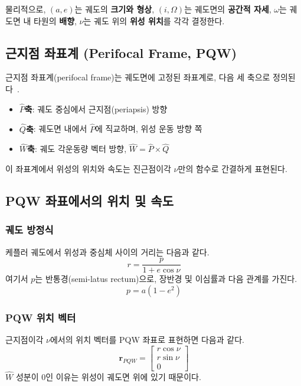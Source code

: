 \documentclass[11pt]{article}
\begin{document}
물리적으로, $(a, e)$는 궤도의 \textbf{크기와 형상}, $(i, \Omega)$는 궤도면의 \textbf{공간적 자세}, $\omega$는 궤도면 내 타원의 \textbf{배향}, $\nu$는 궤도 위의 \textbf{위성 위치}를 각각 결정한다.

\subsection{근지점 좌표계 (Perifocal Frame, PQW)}

근지점 좌표계(perifocal frame)는 궤도면에 고정된 좌표계로, 다음 세 축으로 정의된다~\cite{Curtis2020}.

\begin{itemize}
  \item \textbf{$\hat{P}$축}: 궤도 중심에서 근지점(periapsis) 방향
  \item \textbf{$\hat{Q}$축}: 궤도면 내에서 $\hat{P}$에 직교하며, 위성 운동 방향 쪽
  \item \textbf{$\hat{W}$축}: 궤도 각운동량 벡터 방향, $\hat{W} = \hat{P} \times \hat{Q}$
\end{itemize}

이 좌표계에서 위성의 위치와 속도는 진근점이각 $\nu$만의 함수로 간결하게 표현된다.

\subsection{PQW 좌표에서의 위치 및 속도}

\subsubsection{궤도 방정식}

케플러 궤도에서 위성과 중심체 사이의 거리는 다음과 같다.
\[
  r = \frac{p}{1 + e \cos\nu}
\]
여기서 $p$는 반통경(semi-latus rectum)으로, 장반경 및 이심률과 다음 관계를 가진다.
\[
  p = a(1 - e^2)
\]

\subsubsection{PQW 위치 벡터}

근지점이각 $\nu$에서의 위치 벡터를 PQW 좌표로 표현하면 다음과 같다.
\[
  \mathbf{r}_{PQW} = \begin{bmatrix} r\cos\nu \\ r\sin\nu \\ 0 \end{bmatrix}
\]
$\hat{W}$ 성분이 0인 이유는 위성이 궤도면 위에 있기 때문이다.
\end{document}
